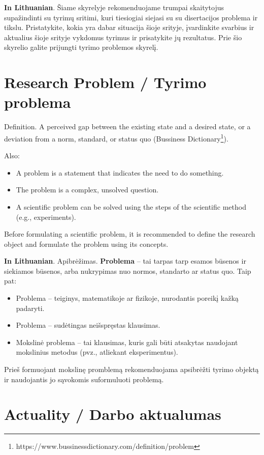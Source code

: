 \textbf{In Lithuanian}.
Šiame skyrelyje rekomenduojame trumpai skaitytojus supažindinti su tyrimų sritimi, kuri tiesiogiai siejasi su su diser\-tacijos problema ir tikslu. Pristatykite, kokia yra dabar situacija šioje srityje, įvardinkite svarbius ir aktualius šioje srityje vykdomus tyrimus ir prisatykite jų rezultatus. Prie šio skyrelio galite prijungti tyrimo problemos skyrelį.

\section*{Research Problem / Tyrimo problema}

Definition. A perceived gap between the existing state and a desired state, or a deviation from a norm, standard, or status quo (Bussiness Dictionary\footnote{https://www.bussinessdictionary.com/definition/problem}).

Also:
\begin{itemize}
    \item A problem is a statement that indicates the need to do something.
    \item The problem is a complex, unsolved question. 
    \item A scientific problem can be solved using the steps of the scientific method (e.g., experiments).
\end{itemize}
Before formulating a scientific problem, it is recommended to define the research object and formulate the problem using its concepts.


\textbf{In Lithuanian}. Apibrėžimas. \textbf{Problema} – tai tarpas tarp esamos būsenos ir siekiamos būsenos, arba nukrypimas nuo normos, standarto ar status quo.
Taip pat:
\begin{itemize}
    \item Problema – teiginys, matematikoje ar fizikoje, nurodantis poreikį kažką padaryti.
    \item Problema – sudėtingas neišspręstas klausimas. 
    \item Mokslinė problema – tai klausimas, kuris gali būti atsakytas naudojant mokslinius metodus (pvz., atliekant eksperimentus).
\end{itemize}
Prieš formuojant mokslinę promblemą rekomenduojama apsibrėžti tyrimo objektą ir naudojantis jo sąvokomis suformuluoti problemą.


\section*{Actuality / Darbo aktualumas}

